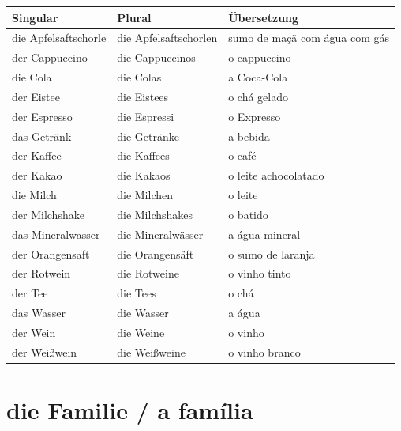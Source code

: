             \begin{longtabu}to 
                \toprule
                \textbf{Singular} & \textbf{Plural} & \textbf{Übersetzung} \\ 
                \toprule \endhead
                    die Apfelsaftschorle & die Apfelsaftschorlen & sumo de maçã com água com gás\\ \hline
                    der Cappuccino & die Cappuccinos & o cappuccino\\ \hline
                    die Cola & die Colas & a Coca-Cola\\ \hline
                    der Eistee & die Eistees & o chá gelado\\ \hline  
                    der Espresso & die Espressi & o Expresso\\ \hline
                    das Getränk & die Getränke & a bebida\\ \hline
                    der Kaffee & die Kaffees & o café\\ \hline
                    der Kakao & die Kakaos & o leite achocolatado\\ \hline
                    die Milch & die Milchen & o leite\\ \hline
                    der Milchshake & die Milchshakes & o batido\\ \hline
                    das Mineralwasser & die Mineralwässer & a água mineral\\ \hline
                    der Orangensaft & die Orangensäft & o sumo de laranja\\ \hline
                    der Rotwein & die Rotweine & o vinho tinto\\ \hline
                    der Tee & die Tees & o chá\\ \hline
                    das Wasser & die Wasser & a água\\ \hline
                    der Wein & die Weine & o vinho\\ \hline
                    der Weißwein & die Weißweine & o vinho branco\\ \hline
                \toprule
            \end{longtabu}

    \section{die Familie / a família}\label{section:deutsch:die_familie}
            
